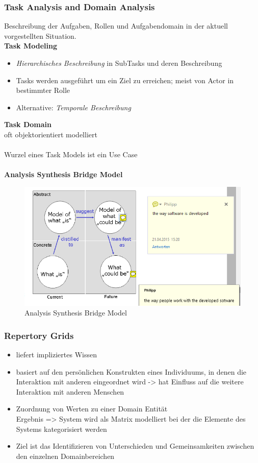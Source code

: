 \subsubsection{Task Analysis and Domain Analysis}
Beschreibung der Aufgaben, Rollen und Aufgabendomain in der aktuell vorgestellten Situation.\\
\textbf{Task Modeling}
\begin{itemize}
	\item \textit{Hierarchisches Beschreibung} in  SubTasks und deren Beschreibung
	\item Tasks werden ausgeführt um ein Ziel zu erreichen; meist von Actor in bestimmter Rolle
	\item Alternative: \textit{Temporale Beschreibung} 
\end{itemize}
\textbf{Task Domain}\\
oft objektorientiert modelliert\\
\\
Wurzel eines Task Models ist ein Use Case\\
\\
\textbf{Analysis Synthesis Bridge Model}
\begin{figure}[!h]
	\centering
	\includegraphics[scale=0.6]{img/analysis_synthesis_bridge_model.png}
	\caption{Analysis Synthesis Bridge Model}
\end{figure}

\subsubsection{Repertory Grids}
\begin{itemize}
	\item liefert impliziertes Wissen
	\item basiert auf den persönlichen Konstrukten eines Individuums, in denen die Interaktion mit anderen eingeordnet wird -> hat Einfluss auf die weitere Interaktion mit anderen Menschen
	\item Zuordnung von Werten zu einer Domain Entität\\
	Ergebnis => System wird als Matrix modelliert bei der die Elemente des Systems kategorisiert werden
	\item Ziel ist das Identifizieren von Unterschieden und Gemeinsamkeiten zwischen den einzelnen Domainbereichen
\end{itemize}

